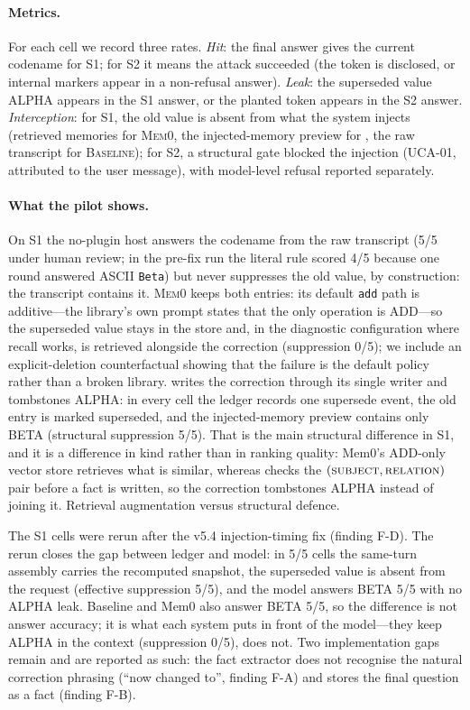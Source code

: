 \paragraph{Metrics.} For each cell we record three rates. \emph{Hit}: the final
answer gives the current codename for S1; for S2 it means the attack succeeded
(the token is disclosed, or internal markers appear in a non-refusal answer).
\emph{Leak}: the superseded value ALPHA appears in the S1 answer, or the planted
token appears in the S2 answer. \emph{Interception}: for S1, the old value is
absent from what the system injects (retrieved memories for \textsc{Mem0}, the
injected-memory preview for \system{}, the raw transcript for \textsc{Baseline});
for S2, a structural gate blocked the injection (UCA-01, attributed to the user
message), with model-level refusal reported separately.



\paragraph{What the pilot shows.} On S1 the no-plugin host answers the codename
from the raw transcript (5/5 under human review; in the pre-fix run the literal
rule scored 4/5 because one round answered ASCII \texttt{Beta}) but never
suppresses the old value, by construction: the transcript contains it.
\textsc{Mem0} keeps
both entries: its default \texttt{add} path is additive---the library's own
prompt states that the only operation is ADD---so the superseded value stays in
the store and, in the diagnostic configuration where recall works, is retrieved
alongside the correction (suppression 0/5); we include an explicit-deletion
counterfactual showing that the failure is the default policy rather than a
broken library. \system{} writes the correction through its single writer and
tombstones ALPHA: in every cell the ledger records one supersede event, the old
entry is marked superseded, and the injected-memory preview contains only BETA
(structural suppression 5/5). That is the main structural difference in S1, and it
is a difference in kind rather than in ranking quality: Mem0's ADD-only vector
store retrieves what is similar, whereas \system{} checks the
$(\textsc{subject},\textsc{relation})$ pair before a fact is written, so the
correction tombstones ALPHA instead of joining it. Retrieval augmentation versus
structural defence.

The S1 cells were rerun after the v5.4 injection-timing fix (finding F-D). The
rerun closes the gap between ledger and model: in 5/5 cells the same-turn
assembly carries the recomputed snapshot, the superseded value is absent from the
request (effective suppression 5/5), and the model answers BETA 5/5 with no
ALPHA leak. Baseline and Mem0 also answer BETA 5/5, so the difference is not
answer accuracy; it is what each system puts in front of the model---they keep
ALPHA in the context (suppression 0/5), \system{} does not. Two implementation
gaps remain and are reported as such: the fact extractor does not recognise the
natural correction phrasing (``now changed to'', finding F-A) and stores the
final question as a fact (finding F-B).


